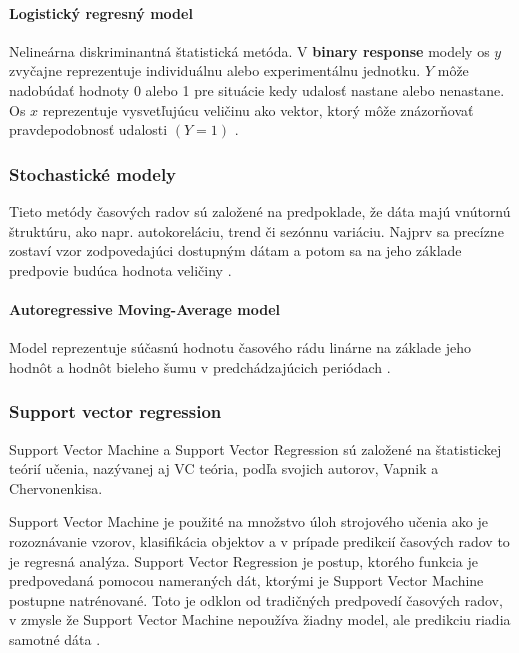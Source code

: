 \documentclass[a4paper,slovak,12pt,appendix]{article}
\begin{document}
\paragraph{Logistický regresný model}
Nelineárna diskriminantná štatistická metóda. V \textbf{binary response} modely
os $y$ zvyčajne reprezentuje individuálnu alebo experimentálnu jednotku. $Y$ môže
nadobúdať hodnoty 0 alebo 1 pre situácie kedy udalosť nastane alebo nenastane.
Os $x$ reprezentuje vysvetľujúcu veličinu ako vektor, ktorý môže znázorňovať
pravdepodobnosť udalosti $(Y = 1)$ \cite{Li2010}.


\subsubsection{Stochastické modely}
Tieto metódy časových radov sú založené na predpoklade, že dáta majú vnútornú
štruktúru, ako napr. autokoreláciu, trend či sezónnu variáciu. Najprv sa
precízne zostaví vzor zodpovedajúci dostupným dátam a potom sa na jeho základe
predpovie budúca hodnota veličiny \cite{KumarSingh2013}.

\paragraph{Autoregressive Moving-Average model}
Model reprezentuje súčasnú hodnotu časového rádu linárne na základe jeho hodnôt
a hodnôt bieleho šumu v predchádzajúcich periódach \cite{KumarSingh2013}.


\subsubsection{Support vector regression}
Support Vector Machine a Support Vector Regression sú založené na štatistickej
teórií učenia, nazývanej aj VC teória, podľa svojich autorov, Vapnik
a Chervonenkisa.

Support Vector Machine je použité na množstvo úloh strojového učenia ako je
rozoznávanie vzorov, klasifikácia objektov a v prípade predikcií časových
radov to je regresná analýza. Support Vector Regression je postup, ktorého
funkcia je predpovedaná pomocou nameraných dát, ktorými je Support Vector
Machine postupne natrénované. Toto je odklon od tradičných predpovedí časových
radov, v zmysle že Support Vector Machine nepoužíva žiadny model, ale
predikciu riadia samotné dáta \cite{Sapankevych2009}.
\end{document}
